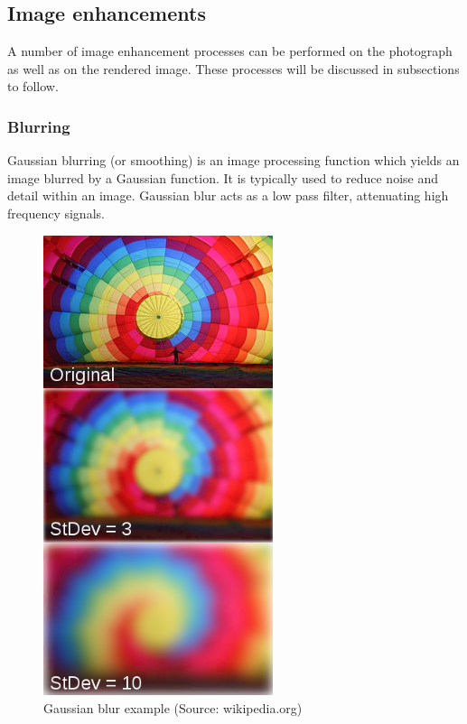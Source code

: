 \documentclass[11pt,a4paper]{report}
\begin{document}
		\subsection{Image enhancements}
			A number of image enhancement processes can be performed on the photograph as well as on the rendered image. These processes will be discussed in subsections to follow.
			\subsubsection{Blurring}
				Gaussian blurring (or smoothing) is an image processing function which yields an image blurred by a Gaussian function. It is typically used to reduce noise and detail within an image. Gaussian blur acts as a low pass filter, attenuating high frequency signals.
				\begin{figure}[H]
					\centering
					\includegraphics[width=0.6\textwidth]{gaussian_blur}
					\caption{Gaussian blur example (Source: wikipedia.org)}
					\label{fig:gaussian_blur}
				\end{figure}
			
\end{document}
